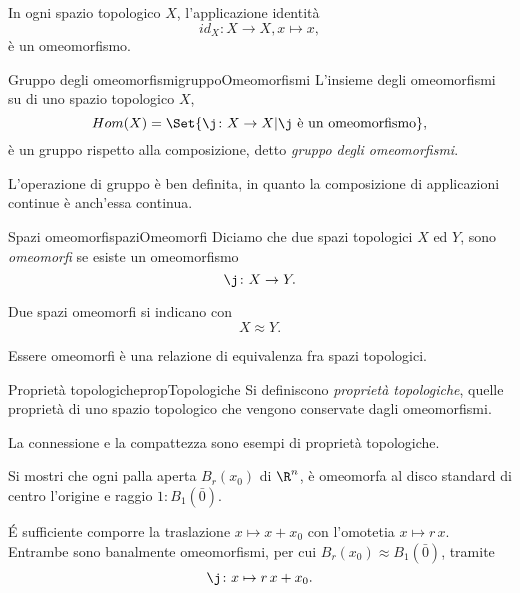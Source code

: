 \begin{ese}
	In ogni spazio topologico \(X\), l'applicazione identità
	\[
		id_X\colon X\to X,x\mapsto x,
	\]
	è un omeomorfismo.
\end{ese}

\begin{defn}{Gruppo degli omeomorfismi}{gruppoOmeomorfismi}
	L'insieme degli omeomorfismi su di uno spazio topologico \(X\),
	\[
		Hom(X)=\Set{\j\colon X\to X | \j\text{ è un omeomorfismo}},
	\]
	è un gruppo rispetto alla composizione, detto \emph{gruppo degli omeomorfismi}.
\end{defn}

\begin{oss}
	L'operazione di gruppo è ben definita, in quanto la composizione di applicazioni continue è anch'essa continua.
\end{oss}

\begin{defn}{Spazi omeomorfi}{spaziOmeomorfi}
	Diciamo che due spazi topologici \(X\) ed \(Y\), sono \emph{omeomorfi} se esiste un omeomorfismo
	\[
		\j\colon X\to Y.
	\]
\end{defn}

\begin{notz}
	Due spazi omeomorfi si indicano con
	\[
		X\approx Y.
	\]
\end{notz}

\begin{oss}
	Essere omeomorfi è una relazione di equivalenza fra spazi topologici.
\end{oss}

\begin{defn}{Proprietà topologiche}{propTopologiche}
	Si definiscono \emph{proprietà topologiche}, quelle proprietà di uno spazio topologico che vengono conservate dagli omeomorfismi.
\end{defn}

\begin{ese}
	La connessione e la compattezza sono esempi di proprietà topologiche.
\end{ese}

\begin{exe}
	Si mostri che ogni palla aperta \(B_r(x_0)\) di \(\R^n\), è omeomorfa al disco standard di centro l'origine e raggio \(1:B_1(\bar{0})\).
\end{exe}

\begin{sol}
	\'E sufficiente comporre la traslazione \(x\mapsto x+x_0\) con l'omotetia \(x\mapsto r\,x\).
	Entrambe sono banalmente omeomorfismi, per cui \(B_r(x_0)\approx B_1(\bar{0})\), tramite
	\[
		\j\colon x\mapsto r\,x+x_0.
	\]
\end{sol}

